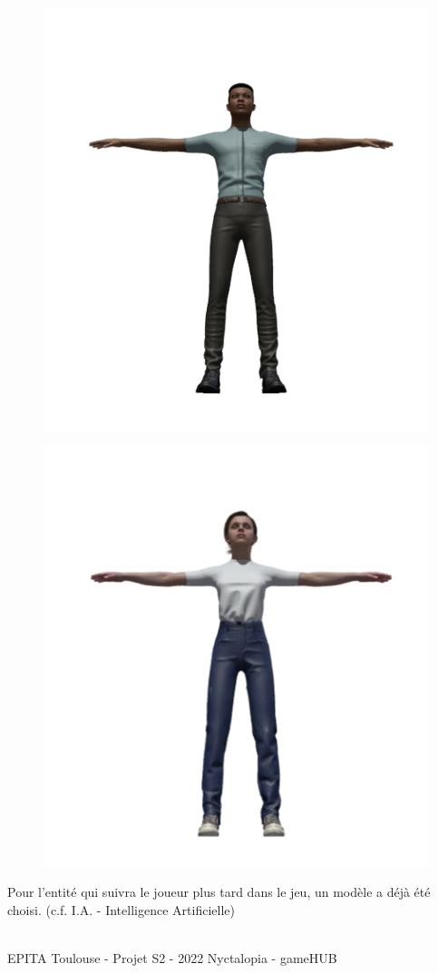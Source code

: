 \begin{figure}[H]
\centering
\begin{minipage}{.5\textwidth}
  \centering
  \includegraphics[width=.6\linewidth]{img/assets/remi.png}
  \label{fig:rémi}
\end{minipage}%
\begin{minipage}{.5\textwidth}
  \centering
  \includegraphics[width=.6\linewidth]{img/assets/sonia.png}
  \label{fig:sonia}
\end{minipage}
\end{figure}

Pour l'entité qui suivra le joueur plus tard dans le jeu, un modèle a déjà été choisi. (c.f. I.A. - Intelligence Artificielle)

\vfill
\noindent\makebox[\linewidth]{\rule{.8\paperwidth}{.6pt}}\\[0.2cm]
EPITA Toulouse - Projet S2 - 2022 \hfill Nyctalopia - gameHUB
\noindent\makebox[\linewidth]{\rule{.8\paperwidth}{.6pt}}

